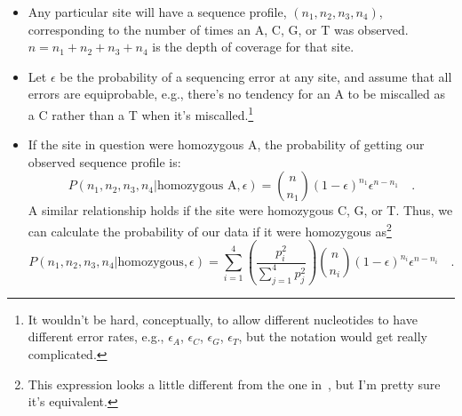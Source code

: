 \begin{itemize}

\item Any particular site will have a sequence profile, $(n_1, n_2,
  n_3, n_4)$, corresponding to the number of times an A, C, G, or T
  was observed. $n=n_1+n_2+n_3+n_4$ is the depth of coverage for that
  site. 

\item Let $\epsilon$ be the probability of a sequencing error at any
  site, and assume that all errors are equiprobable, e.g., there's no
  tendency for an A to be miscalled as a C rather than a T when it's
  miscalled.\footnote{It wouldn't be hard, conceptually, to allow
    different nucleotides to have different error rates, e.g.,
    $\epsilon_A$, $\epsilon_C$, $\epsilon_G$, $\epsilon_T$, but the
    notation would get really complicated.} 

\item If the site in question were homozygous A, the probability of
  getting our observed sequence profile is:
\[
P(n_1,n_2,n_3,n_4|\mbox{homozygous A},\epsilon)
=
{n \choose n_1}(1-\epsilon)^{n_1}\epsilon^{n-n_1} \quad .
\]
A similar relationship holds if the site were homozygous C, G, or
T. Thus, we can calculate the probability of our data if it were homozygous
as\footnote{This expression
    looks a little different from the one in~\cite{Lynch-2008}, but
    I'm pretty sure it's equivalent.}
\[
P(n_1,n_2,n_3,n_4|\mbox{homozygous},\epsilon)
=
\sum_{i=1}^4 \left(\frac{p_i^2}{\sum_{j=1}^4p_j^2}\right) 
{n \choose n_i}(1-\epsilon)^{n_i}\epsilon^{n-n_i}
\quad .
\]


\end{itemize}
